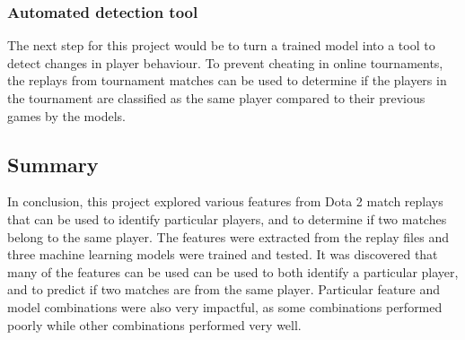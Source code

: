 \documentclass[Report.tex]{subfiles}
\begin{document}
\subsubsection{Automated detection tool}
The next step for this project would be to turn a trained model into a tool to detect changes in player behaviour. To prevent cheating in online tournaments, the replays from tournament matches can be used to determine if the players in the tournament are classified as the same player compared to their previous games by the models. 

\subsection{Summary}
In conclusion, this project explored various features from Dota 2 match replays that can be used to identify particular players, and to determine if two matches belong to the same player. The features were extracted from the replay files and three machine learning models were trained and tested. It was discovered that many of the features can be used can be used to both identify a particular player, and to predict if two matches are from the same player. Particular feature and model combinations were also very impactful, as some combinations performed poorly while other combinations performed very well. 
\end{document}
